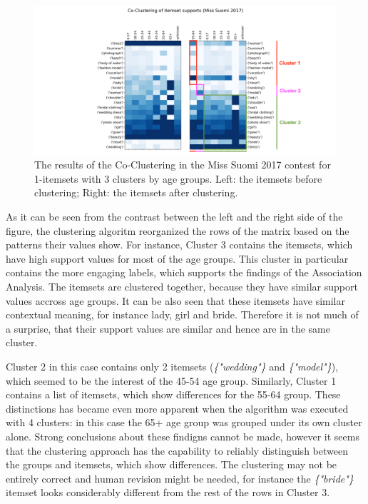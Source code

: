 \begin{figure} 
    \begin{center}
        \includegraphics[width=1.2\textwidth,center]{Images/coclustering_miss-suomi-age_groups-1-itemsets.png}
        \caption{The results of the Co-Clustering in the Miss Suomi 2017 contest for 1-itemsets with 3 clusters by age groups. Left: the itemsets before clustering; Right: the itemsets after clustering.}
        \label{coclustering_miss-suomi-age_groups-1-itemsets}
    \end{center}
\end{figure}

As it can be seen from the contrast between the left and the right side of the figure, the clustering algoritm reorganized the rows of the matrix based on the patterns their values show. For instance, Cluster 3 contains the itemsets, which have high support values for most of the age groups. This cluster in particular contains the more engaging labels, which supports the findings of the Association Analysis. The itemsets are clustered together, because they have similar support values accross age groups. It can be also seen that these itemsets have similar contextual meaning, for instance lady, girl and bride. Therefore it is not much of a surprise, that their support values are similar and hence are in the same cluster.

Cluster 2 in this case contains only 2 itemsets (\emph{\{"wedding"\}} and \emph{\{"model"\}}), which seemed to be the interest of the 45-54 age group. Similarly, Cluster 1 contains a list of itemsets, which show differences for the 55-64 group. These distinctions has became even more apparent when the algorithm was executed with 4 clusters: in this case the 65+ age group was grouped under its own cluster alone. Strong conclusions about these findigns cannot be made, however it seems that the clustering approach has the capability to reliably distinguish between the groups and itemsets, which show differences. The clustering may not be entirely correct and human revision might be needed, for instance the \emph{\{"bride"\}} itemset looks considerably different from the rest of the rows in Cluster 3.

